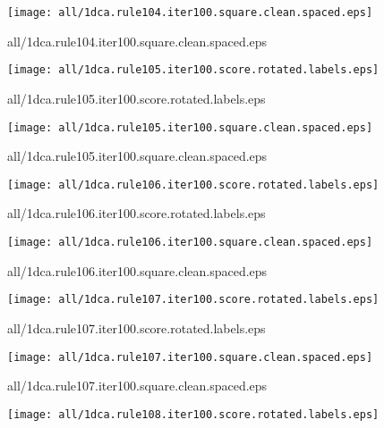 \documentclass{article}
\begin{document}
\begin{center}
\begin{minipage}{\textwidth}
\texttt{[image: all/1dca.rule104.iter100.square.clean.spaced.eps]}
\end{minipage}
\end{center}
{\footnotesize all/1dca.rule104.iter100.square.clean.spaced.eps}
\begin{center}
\begin{minipage}{\textwidth}
\texttt{[image: all/1dca.rule105.iter100.score.rotated.labels.eps]}
\end{minipage}
\end{center}
{\footnotesize all/1dca.rule105.iter100.score.rotated.labels.eps}
\begin{center}
\begin{minipage}{\textwidth}
\texttt{[image: all/1dca.rule105.iter100.square.clean.spaced.eps]}
\end{minipage}
\end{center}
{\footnotesize all/1dca.rule105.iter100.square.clean.spaced.eps}
\begin{center}
\begin{minipage}{\textwidth}
\texttt{[image: all/1dca.rule106.iter100.score.rotated.labels.eps]}
\end{minipage}
\end{center}
{\footnotesize all/1dca.rule106.iter100.score.rotated.labels.eps}
\begin{center}
\begin{minipage}{\textwidth}
\texttt{[image: all/1dca.rule106.iter100.square.clean.spaced.eps]}
\end{minipage}
\end{center}
{\footnotesize all/1dca.rule106.iter100.square.clean.spaced.eps}
\begin{center}
\begin{minipage}{\textwidth}
\texttt{[image: all/1dca.rule107.iter100.score.rotated.labels.eps]}
\end{minipage}
\end{center}
{\footnotesize all/1dca.rule107.iter100.score.rotated.labels.eps}
\begin{center}
\begin{minipage}{\textwidth}
\texttt{[image: all/1dca.rule107.iter100.square.clean.spaced.eps]}
\end{minipage}
\end{center}
{\footnotesize all/1dca.rule107.iter100.square.clean.spaced.eps}
\begin{center}
\begin{minipage}{\textwidth}
\texttt{[image: all/1dca.rule108.iter100.score.rotated.labels.eps]}
\end{minipage}
\end{center}
\end{document}
